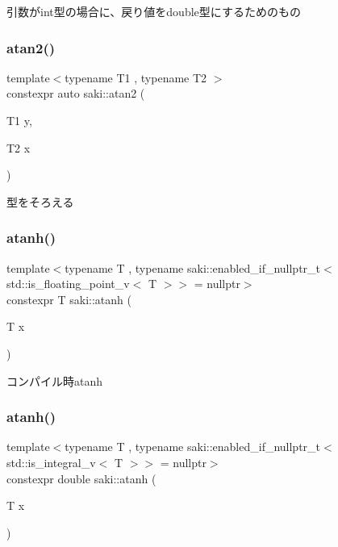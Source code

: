 引数がint型の場合に、戻り値をdouble型にするためのもの 

\mbox{\label{namespacesaki_a5c656a9f2a0c0cfe522fb95ac37128cc}} 
\subsubsection{\texorpdfstring{atan2()}{atan2()}\hspace{0.1cm}{\footnotesize\ttfamily [3/3]}}
{\footnotesize\ttfamily template$<$typename T1 , typename T2 $>$ \\
constexpr auto saki\+::atan2 (\begin{DoxyParamCaption}\item[{T1}]{y,  }\item[{T2}]{x }\end{DoxyParamCaption})}



型をそろえる 

\mbox{\label{namespacesaki_adbfceeab527c51676d00fae31e077dcf}} 
\subsubsection{\texorpdfstring{atanh()}{atanh()}\hspace{0.1cm}{\footnotesize\ttfamily [1/2]}}
{\footnotesize\ttfamily template$<$typename T , typename saki\+::enabled\+\_\+if\+\_\+nullptr\+\_\+t$<$ std\+::is\+\_\+floating\+\_\+point\+\_\+v$<$ T $>$$>$  = nullptr$>$ \\
constexpr T saki\+::atanh (\begin{DoxyParamCaption}\item[{T}]{x }\end{DoxyParamCaption})}



コンパイル時atanh 

\mbox{\label{namespacesaki_a1b7d87f99b61600e1201b10de467200f}} 
\subsubsection{\texorpdfstring{atanh()}{atanh()}\hspace{0.1cm}{\footnotesize\ttfamily [2/2]}}
{\footnotesize\ttfamily template$<$typename T , typename saki\+::enabled\+\_\+if\+\_\+nullptr\+\_\+t$<$ std\+::is\+\_\+integral\+\_\+v$<$ T $>$$>$  = nullptr$>$ \\
constexpr double saki\+::atanh (\begin{DoxyParamCaption}\item[{T}]{x }\end{DoxyParamCaption})}



